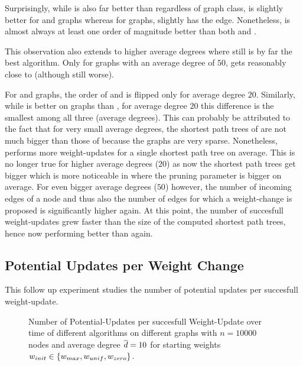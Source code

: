 Surprisingly, while \algbp is also far better than \algns regardless of graph class, \algns is slightly better for \gnp and \dsf graphs whereas for \rhg graphs, \algsp slightly has the edge.
Nonetheless, \algbp is almost always at least one order of magnitude better than both \algsp and \algns.

This observation also extends to higher average degrees where \algbp still is by far the best algorithm.
Only for \dsf graphs with an average degree of $50$, \algns gets reasonably close to \algbp (although still worse).

For \gnp and \rhg graphs, the order of \algsp and \algns is flipped only for average degree $20$.
Similarly, while \algns is better on \dsf graphs than \algsp, for average degree $20$ this difference is the smallest among all three (average degrees).
This can probably be attributed to the fact that for very small average degrees, the shortest path trees of \algns are not much bigger than those of \algsp because the graphs are very sparse.
Nonetheless, \algns performs more weight-updates for a single shortest path tree on average.
This is no longer true for higher average degrees ($20$) as now the shortest path trees get bigger which is more noticeable in \algns where the pruning parameter is bigger on average.
For even bigger average degrees ($50$) however, the number of incoming edges of a node and thus also the number of edges for which a weight-change is proposed is significantly higher again.
At this point, the number of succesfull weight-updates grew faster than the size of the computed shortest path trees, hence \algns now performing better than \algsp again.



\subsection{Potential Updates per Weight Change}
This follow up experiment studies the number of potential updates per succesfull weight-update.

\begin{figure}[!tb]
  \centering
  \caption{
    Number of Potential-Updates per succesfull Weight-Update over time of different algorithms on different graphs with $n = 10000$ nodes and average degree $\overline{d} = 10$ for starting weights $w_{init} \in \left\{w_{max}, w_{unif}, w_{zero}\right\}$.
  }
  \label{fig:pot_per_wu}
\end{figure}

